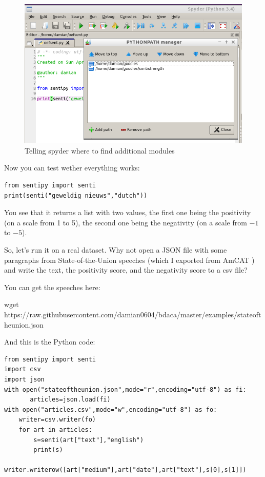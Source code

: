 \documentclass[a4paper,12pt]{book}
\begin{document}
\begin{figure}[h]
	\centering
	\includegraphics[width=.8\textwidth, keepaspectratio]{../pictures/pythonpath}
	\caption{\label{fig:pythonpath}Telling spyder where to find additional modules}
\end{figure}


Now you can test wether everything works:


\begin{lstlisting}
from sentipy import senti
print(senti("geweldig nieuws","dutch"))
\end{lstlisting}

You see that it returns a list with two values, the first one being the positivity (on a scale from 1 to 5), the second one being the negativity (on a scale from $-1$ to $-5$).

So, let's run it on a real dataset. Why not open a JSON file with some paragraphs from State-of-the-Union speeches (which I exported from AmCAT \citep{VanAtteveldt2008}) and write the text, the positivity score, and the negativity score to a csv file?

You can get the speeches here:
\begin{lstlistingbash}
wget https://raw.githubusercontent.com/damian0604/bdaca/master/examples/stateoftheunion.json
\end{lstlistingbash}

And this is the Python code:

\begin{lstlisting}
from sentipy import senti
import csv
import json
with open("stateoftheunion.json",mode="r",encoding="utf-8") as fi:
       articles=json.load(fi)
with open("articles.csv",mode="w",encoding="utf-8") as fo:
    writer=csv.writer(fo)
    for art in articles:
        s=senti(art["text"],"english")
        print(s)
        writer.writerow([art["medium"],art["date"],art["text"],s[0],s[1]])         
\end{lstlisting}
\end{document}
